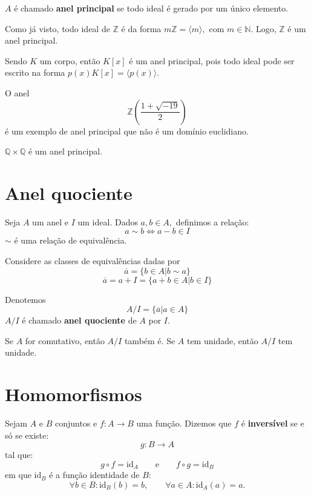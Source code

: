 \documentclass[11pt,twoside,a4paper]{book}
\begin{document}
\begin{definicao}
$A$ é chamado \textbf{anel principal} se todo ideal é gerado por um único elemento.
\end{definicao}

\begin{exemplo}
Como já visto, todo ideal de $\mathbb{Z}$ é da forma $m \mathbb{Z} = \langle m \rangle,$ com $m \in \mathbb{N}.$ Logo, $\mathbb{Z}$ é um anel principal.
\end{exemplo}
\begin{exemplo}
Sendo $K$ um corpo, então $K[x]$ é um anel principal, pois todo ideal pode ser escrito na forma $p(x)K[x] = \langle p(x) \rangle.$
\end{exemplo}

\begin{exemplo}
O anel
\[
\mathbb{Z} \left( \frac{ 1 + \sqrt{-19}}{2} \right)
\]
é um exemplo de anel principal que não é um domínio euclidiano.
\end{exemplo}
\begin{exemplo}
$\mathbb{Q} \times \mathbb{Q}$ é um anel principal.
\end{exemplo}

\section{Anel quociente}

\begin{definicao}
Seja $A$ um anel e $I$ um ideal. Dados $a,b \in A,$ definimos a relação:
\[
a \sim b \Leftrightarrow a - b \in I
\]
$\sim$ é uma relação de equivalência.
\end{definicao}

Considere as classes de equivalências dadas por
\[
\overline{a} = \{ b \in A | b \sim a \}
\]
\[
\overline{a} = a + I = \{ a + b \in A | b \in I \}
\]

Denotemos
\[
A/I = \{ \overline{a} |a \in A \}
\]
$A/I$ é chamado \textbf{anel quociente} de $A$ por $I.$

Se $A$ for comutativo, então $A/I$ também é.
Se $A$ tem unidade, então $A/I$ tem unidade.

\section{Homomorfismos}

Sejam $A$ e $B$ conjuntos e $f:A\rightarrow B$ uma função. Dizemos que $f$ é \textbf{inversível} se e só se existe:
\[
g:B\rightarrow A
\]
tal que:
\[
g\circ f=\mathrm{id}_A\quad\quad\text{e}\quad\quad f\circ g=\mathrm{id}_B
\]
em que $\mathrm{id}_B$ é a função identidade de $B$:
\[
\forall b\in B:\mathrm{id}_B(b)=b,\quad\quad\forall a\in A:\mathrm{id}_A(a)=a.
\]
\end{document}
